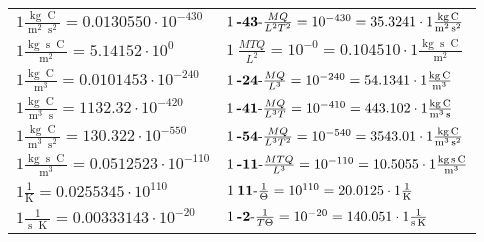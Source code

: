 \begin{center}
\begin{longtable}{l l}
{\color{black}$1 \bm{\mathrm{ }}\frac{\operatorname{kg}\operatorname{C}}{\operatorname{m}^2\operatorname{s}^2} = 0.0130550\cdot10^{-430} $}&
	{\color{black}$1\:\text{\textbf{-43}-} \frac{MQ}{L^2T^2}=10^{-430} = 35.3241 \cdot 1 \bm{\mathrm{ }}\frac{\operatorname{kg}\operatorname{C}}{\operatorname{m}^2\operatorname{s}^2}$}\\
{\color{black}$1 \bm{\mathrm{ }}\frac{\operatorname{kg}\operatorname{s}\operatorname{C}}{\operatorname{m}^2} = 5.14152\cdot10^{0} $}&
	{\color{black}$1\:\text{} \frac{MTQ}{L^2}=10^{-0} = 0.104510 \cdot 1 \bm{\mathrm{ }}\frac{\operatorname{kg}\operatorname{s}\operatorname{C}}{\operatorname{m}^2}$}\\
{\color{black}$1 \bm{\mathrm{ }}\frac{\operatorname{kg}\operatorname{C}}{\operatorname{m}^3} = 0.0101453\cdot10^{-240} $}&
	{\color{black}$1\:\text{\textbf{-24}-} \frac{MQ}{L^3}=10^{-240} = 54.1341 \cdot 1 \bm{\mathrm{ }}\frac{\operatorname{kg}\operatorname{C}}{\operatorname{m}^3}$}\\
{\color{black}$1 \bm{\mathrm{ }}\frac{\operatorname{kg}\operatorname{C}}{\operatorname{m}^3\operatorname{s}} = 1132.32\cdot10^{-420} $}&
	{\color{black}$1\:\text{\textbf{-41}-} \frac{MQ}{L^3T}=10^{-410} = 443.102 \cdot 1 \bm{\mathrm{ }}\frac{\operatorname{kg}\operatorname{C}}{\operatorname{m}^3\operatorname{s}}$}\\
{\color{black}$1 \bm{\mathrm{ }}\frac{\operatorname{kg}\operatorname{C}}{\operatorname{m}^3\operatorname{s}^2} = 130.322\cdot10^{-550} $}&
	{\color{black}$1\:\text{\textbf{-54}-} \frac{MQ}{L^3T^2}=10^{-540} = 3543.01 \cdot 1 \bm{\mathrm{ }}\frac{\operatorname{kg}\operatorname{C}}{\operatorname{m}^3\operatorname{s}^2}$}\\
{\color{black}$1 \bm{\mathrm{ }}\frac{\operatorname{kg}\operatorname{s}\operatorname{C}}{\operatorname{m}^3} = 0.0512523\cdot10^{-110} $}&
	{\color{black}$1\:\text{\textbf{-11}-} \frac{MTQ}{L^3}=10^{-110} = 10.5055 \cdot 1 \bm{\mathrm{ }}\frac{\operatorname{kg}\operatorname{s}\operatorname{C}}{\operatorname{m}^3}$}\\
\hline{\color{black}$1 \bm{\mathrm{ }}\frac1{\operatorname{K}} = 0.0255345\cdot10^{110} $}&
	{\color{black}$1\:\text{\textbf{11}-} \frac1{\Theta}=10^{110} = 20.0125 \cdot 1 \bm{\mathrm{ }}\frac1{\operatorname{K}}$}\\
{\color{black}$1 \bm{\mathrm{ }}\frac1{\operatorname{s}\operatorname{K}} = 0.00333143\cdot10^{-20} $}&
	{\color{black}$1\:\text{\textbf{-2}-} \frac1{T\Theta}=10^{-20} = 140.051 \cdot 1 \bm{\mathrm{ }}\frac1{\operatorname{s}\operatorname{K}}$}\\

\end{longtable}
\end{center}
